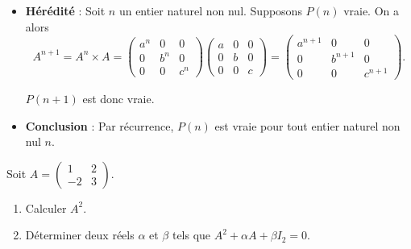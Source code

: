 \documentclass[11pt,fleqn]{book} %
\begin{document}
\begin{solution}
\begin{itemize}
	\item \textbf{Hérédité} : Soit \(n\) un entier naturel non nul. Supposons \(P(n)\) vraie. On a alors
		\[A^{n+1}=A^n \times A = \begin{pmatrix}a^n & 0 & 0 \\0 & b^n & 0 \\ 0 & 0 & c^n\end{pmatrix}\begin{pmatrix}a & 0 & 0 \\0 & b & 0 \\ 0 & 0 & c\end{pmatrix}=\begin{pmatrix}a^{n+1} & 0 & 0 \\0 & b^{n+1} & 0 \\ 0 & 0 & c^{n+1}\end{pmatrix}.\]

	\(P(n+1)\) est donc vraie.
	\item \textbf{Conclusion} : Par récurrence, \(P(n)\) est vraie pour tout entier naturel non nul \(n\).\end{itemize}\end{solution}


\begin{exercise}[topic=mat02]
\begin{minipage}{0.2\linewidth}Soit $A=\begin{pmatrix}1 & 2 \\-2 & 3 \end{pmatrix}$.
\end{minipage}\hfill \begin{minipage}{0.75\linewidth}
\begin{enumerate}
\item Calculer $A^2$.
\item Déterminer deux réels $\alpha$ et $\beta$ tels que $A^2+\alpha A + \beta I_2 = 0$.
\end{enumerate}
\end{minipage}\end{exercise}
\end{document}
